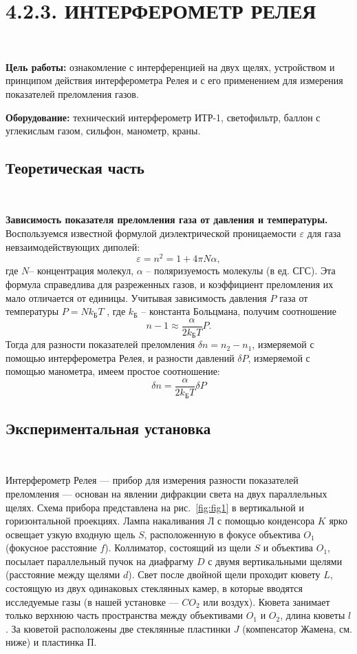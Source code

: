 \documentclass[12pt]{article}
\begin{document}
    \section*{4.2.3. ИНТЕРФЕРОМЕТР РЕЛЕЯ}
    \ \par
    \textbf{Цель работы:} ознакомление с интерференцией на двух щелях,
    устройством и принципом действия интерферометра Релея и с его
    применением для измерения показателей преломления газов. \par
    \textbf{Оборудование:} технический интерферометр ИТР-1, светофильтр,
    баллон с углекислым газом, сильфон, манометр, краны.

    \subsection*{Теоретическая часть}
    \ \par
    \textbf{Зависимость показателя преломления газа от давления и температуры.}
    Воспользуемся известной формулой диэлектрической проницаемости $\varepsilon$ для газа невзаимодействующих диполей:
    \[\varepsilon = n^2 = 1 + 4 \pi N \alpha,\]
    где $N$-- концентрация молекул, $\alpha$ -- поляризуемость молекулы (в ед. СГС).
    Эта формула справедлива для разреженных газов, и коэффициент преломления их мало отличается от единицы.
    Учитывая зависимость давления $P$ газа от температуры $P = N k_{\text{Б}}T$ , где $k_\text{Б}$ --
    константа Больцмана, получим соотношение
    \[n - 1 \approx \frac{\alpha}{2 k_{\text{Б}}T}P.\]
    Тогда для разности показателей преломления $\delta n = n_2 - n_1$, измеряемой с помощью интерферометра Релея,
    и разности давлений $\delta P$, измеряемой с помощью манометра, имеем простое соотношение:
    \[\delta n = \frac{\alpha}{2 k_{\text{Б}}T} \delta P\]


    \subsection*{Экспериментальная установка}
    \ \par
    Интерферометр Релея — прибор для измерения разности показателей преломления —
    основан на явлении дифракции света на двух параллельных щелях.
    Схема прибора представлена на рис.\ \ref{fig:fig1} в вертикальной и горизонтальной проекциях.
    Лампа накаливания $\text{Л}$ с помощью конденсора $K$ ярко освещает узкую входную щель $S$,
    расположенную в фокусе объектива $O_1$ (фокусное расстояние $f$).
    Коллиматор, состоящий из щели $S$ и объектива $O_1$, посылает параллельный пучок
    на диафрагму $D$ с двумя вертикальными щелями (расстояние между щелями $d$).
    Свет после двойной щели проходит кювету $L$, состоящую из двух одинаковых стеклянных камер,
    в которые вводятся исследуемые газы (в нашей установке — $CO_2$ или воздух).
    Кювета занимает только верхнюю часть пространства между объективами $O_1$ и $O_2$, длина кюветы $l$.
    За кюветой расположены две стеклянные пластинки $J$ (компенсатор Жамена, см. ниже) и пластинка $\text{П}$.
\end{document}
